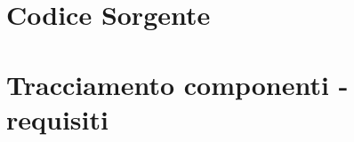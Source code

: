 \appendix\chapter{Codice Sorgente}
\thispagestyle{fancy} %

\chapter{Tracciamento componenti - requisiti}
\thispagestyle{fancy} %


